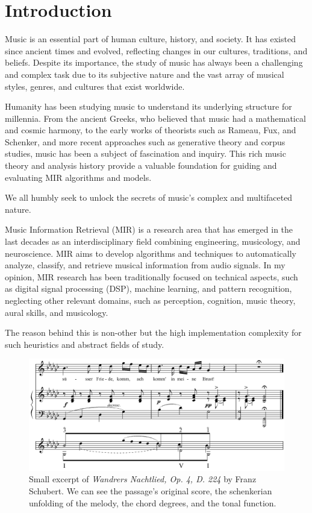 \chapter{Introduction}

Music is an essential part of human culture, history, and society. It has existed since ancient times and evolved, reflecting changes in our cultures, traditions, and beliefs. Despite its importance, the study of music has always been a challenging and complex task due to its subjective nature and the vast array of musical styles, genres, and cultures that exist worldwide.

Humanity has been studying music to understand its underlying structure for millennia. From the ancient Greeks, who believed that music had a mathematical and cosmic harmony, to the early works of theorists such as Rameau, Fux, and Schenker, and more recent approaches such as generative theory and corpus studies, music has been a subject of fascination and inquiry. This rich music theory and analysis history provide a valuable foundation for guiding and evaluating MIR algorithms and models. 

We all humbly seek to unlock the secrets of music's complex and multifaceted nature.

Music Information Retrieval (MIR) is a research area that has emerged in the last decades as an interdisciplinary field combining engineering, musicology, and neuroscience. MIR aims to develop algorithms and techniques to automatically analyze, classify, and retrieve musical information from audio signals. In my opinion, MIR research has been traditionally focused on technical aspects, such as digital signal processing (DSP), machine learning, and pattern recognition, neglecting other relevant domains, such as perception, cognition, music theory, aural skills, and musicology.

The reason behind this is non-other but the high implementation complexity for such heuristics and abstract fields of study.


\begin{figure}[!ht]
\includegraphics[clip,width=\columnwidth]{figures/schenkerian analysis/SchubertOp4no3.png}%
\caption{Small excerpt of \textit{Wandrers Nachtlied, Op. 4, D. 224} by Franz Schubert. We can see the passage's original score, the schenkerian unfolding of the melody, the chord degrees, and the tonal function.}
\label{fig:timeseries}
\end{figure}

